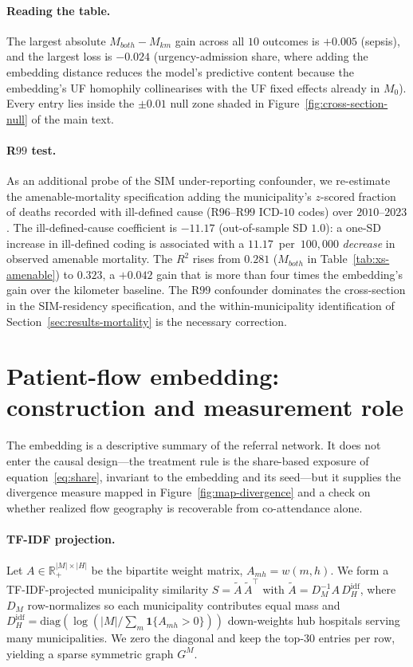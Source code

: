 \paragraph{Reading the table.} The largest absolute
$M_{both} - M_{km}$ gain across all $10$ outcomes is
$+0.005$ (sepsis), and the largest loss is $-0.024$ (urgency-admission
share, where adding the embedding distance reduces the model's
predictive content because the embedding's UF homophily collinearises
with the UF fixed effects already in $M_0$). Every entry lies inside
the $\pm 0.01$ null zone shaded in
Figure~\ref{fig:cross-section-null} of the main text.

\paragraph{R$99$ test.} As an additional probe of the SIM
under-reporting confounder, we re-estimate the amenable-mortality
specification adding the municipality's $z$-scored fraction of deaths
recorded with ill-defined cause (R$96$--R$99$ ICD-$10$ codes) over
$2010$--$2023$. The ill-defined-cause coefficient is $-11.17$ (out-of-sample
SD $1.0$): a one-SD increase in ill-defined coding is associated with a
$11.17$~per~$100{,}000$ \emph{decrease} in observed amenable mortality.
The $R^2$ rises from $0.281$ ($M_{both}$ in
Table~\ref{tab:xs-amenable}) to $0.323$, a $+0.042$ gain that is more
than four times the embedding's gain over the kilometer baseline.
The R$99$ confounder dominates the cross-section in the SIM-residency
specification, and the within-municipality identification of
Section~\ref{sec:results-mortality} is the necessary correction.

\section{Patient-flow embedding: construction and measurement role}
\label{app:embedding}

The embedding is a descriptive summary of the referral network. It does
not enter the causal design---the treatment rule is the share-based
exposure of equation~\eqref{eq:share}, invariant to the embedding and its
seed---but it supplies the divergence measure mapped in
Figure~\ref{fig:map-divergence} and a check on whether realized flow
geography is recoverable from co-attendance alone.

\paragraph{TF-IDF projection.} Let $A \in \mathbb{R}_+^{|M| \times |H|}$
be the bipartite weight matrix, $A_{mh} = w(m,h)$. We form a
TF-IDF-projected municipality similarity
$S = \widetilde{A}\,\widetilde{A}^\top$ with
$\widetilde{A} = D_M^{-1} A\, D_H^{\mathrm{idf}}$, where $D_M$
row-normalizes so each municipality contributes equal mass and
$D_H^{\mathrm{idf}} = \mathrm{diag}(\log(|M|/\sum_m \mathbf{1}\{A_{mh}>0\}))$
down-weights hub hospitals serving many municipalities. We zero the
diagonal and keep the top-$30$ entries per row, yielding a sparse
symmetric graph $G^M$.

